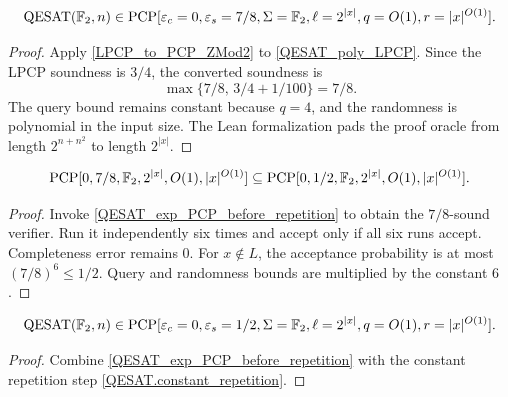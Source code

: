 \begin{theorem}
\label{QESAT_exp_PCP_before_repetition}
\leanok
\[
  \mathrm{QESAT}(\mathbb{F}_2,n) \in
  \mathrm{PCP}[
    \varepsilon_c = 0,
    \varepsilon_s = 7/8,
    \Sigma = \mathbb{F}_2,
    \ell = 2^{|x|},
    q = O(1),
    r = |x|^{O(1)}
  ].
\]
\end{theorem}
\begin{proof}\leanok
Apply \ref{LPCP_to_PCP_ZMod2} to \ref{QESAT_poly_LPCP}. Since the LPCP
soundness is \(3/4\), the converted soundness is
\[
  \max\{7/8,\,3/4+1/100\}=7/8.
\]
The query bound remains constant because \(q=4\), and the randomness is
polynomial in the input size. The Lean formalization pads the proof oracle from
length \(2^{n+n^2}\) to length \(2^{|x|}\).
\end{proof}

\begin{lemma}
\label{QESAT.constant_repetition}
\leanok
\[\mathrm{PCP}[0,7/8,\mathbb{F}_2,2^{|x|},O(1),|x|^{O(1)}] \subseteq \mathrm{PCP}[0,1/2,\mathbb{F}_2,2^{|x|},O(1),|x|^{O(1)}].\]
\end{lemma}
\begin{proof}\leanok
Invoke \ref{QESAT_exp_PCP_before_repetition} to obtain the \(7/8\)-sound
verifier. Run it independently six times and accept only if all six runs
accept. Completeness error remains \(0\). For \(x\notin L\), the acceptance
probability is at most \((7/8)^6\leq 1/2\). Query and randomness bounds are
multiplied by the constant \(6\).
\end{proof}

\begin{theorem}
\label{QESAT_exp_PCP}
\leanok
\[
  \mathrm{QESAT}(\mathbb{F}_2,n) \in
  \mathrm{PCP}[
    \varepsilon_c = 0,
    \varepsilon_s = 1/2,
    \Sigma = \mathbb{F}_2,
    \ell = 2^{|x|},
    q = O(1),
    r = |x|^{O(1)}
  ].
\]
\end{theorem}
\begin{proof}\leanok
Combine \ref{QESAT_exp_PCP_before_repetition} with the constant repetition
step \ref{QESAT.constant_repetition}.
\end{proof}
